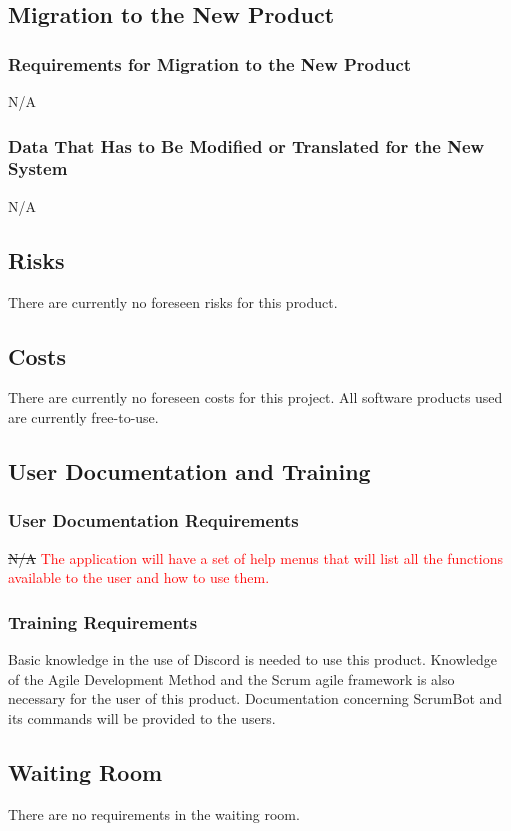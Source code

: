 \documentclass[12pt, titlepage]{article}
\begin{document}
\subsection{Migration to the New Product}
\subsubsection{Requirements for Migration to the New Product}
N/A

\subsubsection{Data That Has to Be Modified or Translated for the New System}
N/A

\subsection{Risks}
There are currently no foreseen risks for this product.

\subsection{Costs}
There are currently no foreseen costs for this project. All software products used are currently free-to-use.

\subsection{User Documentation and Training}
\subsubsection{User Documentation Requirements}
\sout{N/A}
\textcolor{red}{The application will have a set of help menus that will list all the functions available to the user and how to use them.}

\subsubsection{Training Requirements}
Basic knowledge in the use of Discord is needed to use this product. Knowledge of the Agile Development Method and the Scrum agile framework is also necessary for the user of this product. Documentation concerning ScrumBot and its commands will be provided to the users.

\subsection{Waiting Room}
There are no requirements in the waiting room.
\end{document}
